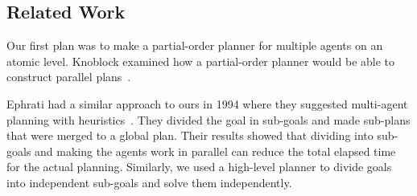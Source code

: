 \subsection{Related Work}
\label{sec:related work}
Our first plan was to make a partial-order planner for multiple agents on an atomic level.
Knoblock examined how a partial-order planner would be able to construct parallel plans~\cite{knoblock1994generating}.

Ephrati had a similar approach to ours in 1994 where they suggested multi-agent planning with heuristics~\cite{ephrati1994divide}.
They divided the goal in sub-goals and made sub-plans that were merged to a global plan.
Their results showed that dividing into sub-goals and making the agents work in parallel can reduce the total elapsed time for the actual planning.
Similarly, we used a high-level planner to divide goals into independent sub-goals and solve them independently.




